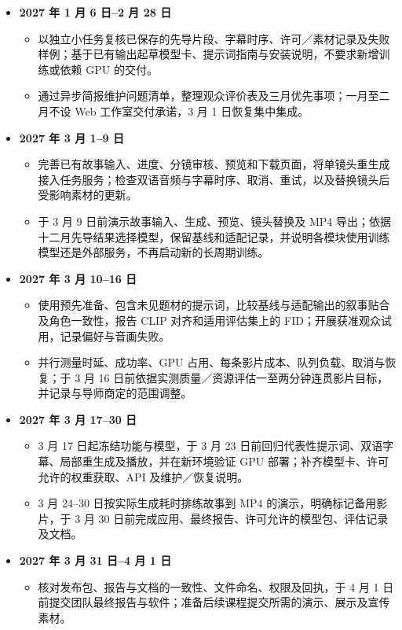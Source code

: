 \documentclass[a4paper,12pt]{article}
\begin{document}
\begin{itemize}
  \item \textbf{2027 年 1 月 6 日--2 月 28 日}
    \begin{itemize}
      \item 以独立小任务复核已保存的先导片段、字幕时序、许可／素材记录及失败样例；基于已有输出起草模型卡、提示词指南与安装说明，不要求新增训练或依赖 GPU 的交付。
      \item 通过异步简报维护问题清单，整理观众评价表及三月优先事项；一月至二月不设 Web 工作室交付承诺，3 月 1 日恢复集中集成。
    \end{itemize}

  \item \textbf{2027 年 3 月 1--9 日}
    \begin{itemize}
      \item 完善已有故事输入、进度、分镜审核、预览和下载页面，将单镜头重生成接入任务服务；检查双语音频与字幕时序、取消、重试，以及替换镜头后受影响素材的更新。
      \item 于 3 月 9 日前演示故事输入、生成、预览、镜头替换及 MP4 导出；依据十二月先导结果选择模型，保留基线和适配记录，并说明各模块使用训练模型还是外部服务，不再启动新的长周期训练。
    \end{itemize}

  \item \textbf{2027 年 3 月 10--16 日}
    \begin{itemize}
      \item 使用预先准备、包含未见题材的提示词，比较基线与适配输出的叙事贴合及角色一致性，报告 CLIP 对齐和适用评估集上的 FID；开展获准观众试用，记录偏好与音画失败。
      \item 并行测量时延、成功率、GPU 占用、每条影片成本、队列负载、取消与恢复；于 3 月 16 日前依据实测质量／资源评估一至两分钟连贯影片目标，并记录与导师商定的范围调整。
    \end{itemize}

  \item \textbf{2027 年 3 月 17--30 日}
    \begin{itemize}
      \item 3 月 17 日起冻结功能与模型，于 3 月 23 日前回归代表性提示词、双语字幕、局部重生成及播放，并在新环境验证 GPU 部署；补齐模型卡、许可允许的权重获取、API 及维护／恢复说明。
      \item 3 月 24--30 日按实际生成耗时排练故事到 MP4 的演示，明确标记备用影片，于 3 月 30 日前完成应用、最终报告、许可允许的模型包、评估记录及文档。
    \end{itemize}

  \item \textbf{2027 年 3 月 31 日--4 月 1 日}
    \begin{itemize}
      \item 核对发布包、报告与文档的一致性、文件命名、权限及回执，于 4 月 1 日前提交团队最终报告与软件；准备后续课程提交所需的演示、展示及宣传素材。
    \end{itemize}

\end{itemize}
\end{document}
